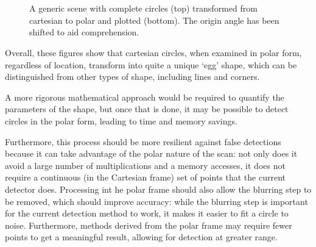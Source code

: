 \documentclass[12pt,oneside,a4paper]{book}
\begin{document}
\begin{figure}[h!]
  \centering
  \\
  ~\\
  \caption{A generic scene with complete circles (top) transformed from cartesian to polar and plotted (bottom). The origin angle has been shifted to aid comprehension.}
  \label{fig:6circles}
\end{figure}

Overall, these figures show that cartesian circles, when examined in
polar form, regardless of location, transform into quite a unique
`egg' shape, which can be distinguished from other types of shape,
including lines and corners.

A more rigorous mathematical approach would be required to quantify
the parameters of the shape, but once that is done, it may be possible
to detect circles in the polar form, leading to time and memory
savings.

Furthermore, this process should be more resilient against false
detections because it can take advantage of the polar nature of the
scan: not only does it avoid a large number of multiplications and a
memory accesses, it does not require a continuous (in the Cartesian
frame) set of points that the current detector does. Processing int he
polar frame should also allow the blurring step to be removed, which
should improve accuracy: while the blurring step is important for the
current detection method to work, it makes it easier to fit a circle
to noise. Furthermore, methods derived from the polar frame may
require fewer points to get a meaningful result, allowing for
detection at greater range.
\end{document}

